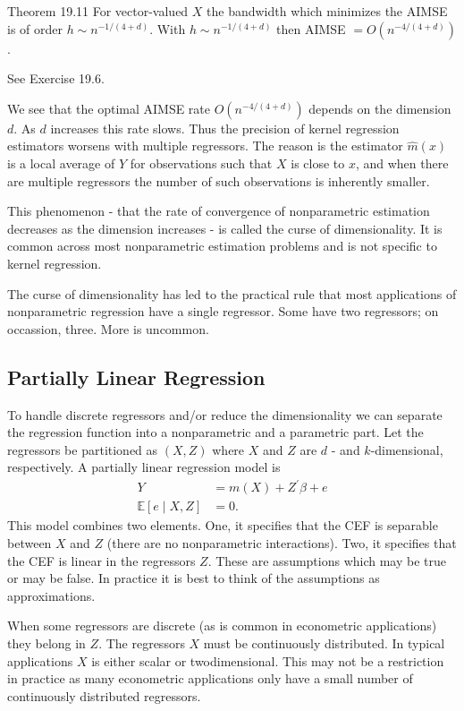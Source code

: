 \documentclass[10pt]{article}
\begin{document}
Theorem 19.11 For vector-valued $X$ the bandwidth which minimizes the AIMSE is of order $h \sim n^{-1 /(4+d)}$. With $h \sim n^{-1 /(4+d)}$ then AIMSE $=O\left(n^{-4 /(4+d)}\right)$.

See Exercise 19.6.

We see that the optimal AIMSE rate $O\left(n^{-4 /(4+d)}\right)$ depends on the dimension $d$. As $d$ increases this rate slows. Thus the precision of kernel regression estimators worsens with multiple regressors. The reason is the estimator $\widehat{m}(x)$ is a local average of $Y$ for observations such that $X$ is close to $x$, and when there are multiple regressors the number of such observations is inherently smaller.

This phenomenon - that the rate of convergence of nonparametric estimation decreases as the dimension increases - is called the curse of dimensionality. It is common across most nonparametric estimation problems and is not specific to kernel regression.

The curse of dimensionality has led to the practical rule that most applications of nonparametric regression have a single regressor. Some have two regressors; on occassion, three. More is uncommon.

\subsection{Partially Linear Regression}
To handle discrete regressors and/or reduce the dimensionality we can separate the regression function into a nonparametric and a parametric part. Let the regressors be partitioned as $(X, Z)$ where $X$ and $Z$ are $d$ - and $k$-dimensional, respectively. A partially linear regression model is
$$
\begin{aligned}
Y &=m(X)+Z^{\prime} \beta+e \\
\mathbb{E}[e \mid X, Z] &=0 .
\end{aligned}
$$
This model combines two elements. One, it specifies that the CEF is separable between $X$ and $Z$ (there are no nonparametric interactions). Two, it specifies that the CEF is linear in the regressors $Z$. These are assumptions which may be true or may be false. In practice it is best to think of the assumptions as approximations.

When some regressors are discrete (as is common in econometric applications) they belong in $Z$. The regressors $X$ must be continuously distributed. In typical applications $X$ is either scalar or twodimensional. This may not be a restriction in practice as many econometric applications only have a small number of continuously distributed regressors.
\end{document}
